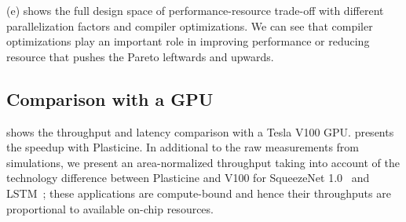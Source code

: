  (e) shows the full design space of performance-resource trade-off with
different parallelization factors and compiler optimizations.
We can see that compiler optimizations play an important role in improving performance or
reducing resource that pushes the Pareto leftwards and upwards.

\subsection{Comparison with a GPU}

 shows the throughput and latency comparison with a Tesla V100 GPU.
 presents the speedup with Plasticine.
In additional to the raw measurements from simulations, we present an area-normalized throughput
taking into account of the technology difference between Plasticine and V100 
for SqueezeNet 1.0~\cite{squeezenet} and LSTM~\cite{lstm}; 
these applications are compute-bound and hence their throughputs are proportional to available 
on-chip resources.


